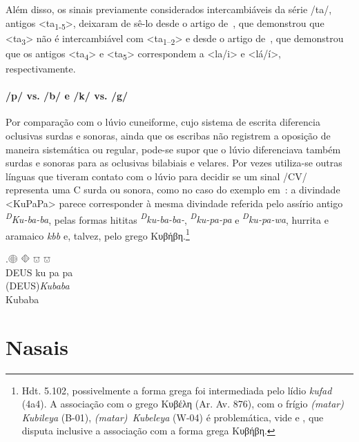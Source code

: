 Além disso, os sinais previamente considerados intercambiáveis da série
/ta/, antigos <ta\textsubscript{1-5}>, deixaram de sê-lo desde o artigo
de~\citet{Rieken2008}, que demonstrou que <ta\textsubscript{3}> não é
intercambiável com <ta\textsubscript{1--2}> e desde o artigo
de~\citet{RiekenYakubovich2010}, que demonstrou que os antigos
<ta\textsubscript{4}> e <ta\textsubscript{5}> correspondem a <la\slash{}i> e
<lá\slash{}í>, respectivamente.

\paragraph{/p/ vs. /b/ e /k/ vs. /g/}
Por comparação com o lúvio cuneiforme, cujo sistema de
escrita diferencia oclusivas surdas e sonoras, ainda que os escribas não
registrem a oposição de maneira sistemática ou regular, pode-se supor que o
lúvio diferenciava também surdas e sonoras para as oclusivas bilabiais e
velares.
Por vezes utiliza-se outras línguas que tiveram contato com o lúvio para
decidir se um sinal /CV/ representa uma C surda ou sonora, como no caso do
exemplo em~\Next: a divindade <KuPaPa> parece corresponder à mesma
divindade referida pelo assírio antigo \emph{\textsuperscript{D}Ku-ba-ba},
pelas formas hititas \emph{\textsuperscript{D}ku-ba-ba-},
\mbox{\emph{\textsuperscript{D}ku-pa-pa}} e \emph{\textsuperscript{D}ku-pa-wa},
hurrita e aramaico \emph{kbb} e, talvez, pelo grego Κυβήβη.\footnote{%
	Hdt. 5.102, possivelmente a forma grega foi intermediada pelo lídio
	\emph{kufad} (4a4).
	A associação com o grego Κυβέλη (Ar. Av. 876), com o frígio
	\emph{(matar) Kubileya} (B-01), \mbox{\emph{(matar) Kubeleya}} (W-04)
	é problemática, vide \citet[280--1]{Obrador2020} e \citet{Oreshko2021},
	que disputa inclusive a associação com a forma grega Κυβήβη.
}


\exg.\Large 𔖖 \Large 𔗜 \Large 𔕸 \Large 𔕸\\
DEUS ku pa pa\\
(DEUS)\emph{Kubaba} \\
Kubaba


\section{Nasais}

